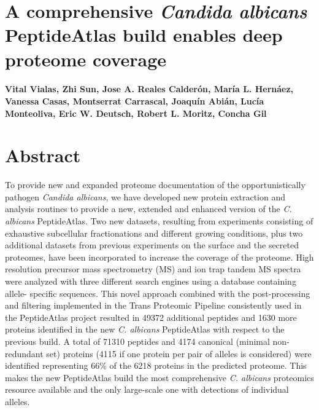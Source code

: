 %
%


\chapter*{A comprehensive \textit{Candida albicans} PeptideAtlas build enables deep proteome coverage}




\renewcommand{\headrulewidth}{0pt}

\subsubsection*{Vital Vialas, Zhi Sun, Jose A. Reales Calder\'on, Mar\'ia L. Hern\'aez, Vanessa Casas, Montserrat Carrascal, Joaqu\'in Abi\'an, Luc\'ia Monteoliva, Eric W. Deutsch, Robert L. Moritz, Concha Gil}

\newpage


\chapter*{Abstract}
To provide new and expanded proteome documentation of the opportunistically pathogen
\textit{Candida albicans}, we have developed new protein extraction and analysis routines to
provide a new, extended and enhanced version of the \textit{C. albicans} PeptideAtlas. Two new
datasets, resulting from experiments consisting of exhaustive subcellular fractionations and
different growing conditions, plus two additional datasets from previous experiments on the
surface and the secreted proteomes, have been incorporated to increase the coverage of the
proteome. High resolution precursor mass spectrometry (MS) and ion trap tandem MS
spectra were analyzed with three different search engines using a database containing allele-
specific sequences. This novel approach combined with the post-processing and filtering
implemented in the Trans Proteomic Pipeline consistently used in the PeptideAtlas project
resulted in 49372 additional peptides and 1630 more proteins identified in the new
\textit{C. albicans} PeptideAtlas with respect to the previous build. A total of 71310 peptides and
4174 canonical (minimal non-redundant set) proteins (4115 if one protein per pair of alleles is
considered) were identified representing 66\% of the 6218 proteins in the predicted proteome.
This makes the new PeptideAtlas build the most comprehensive \textit{C. albicans} proteomics
resource available and the only large-scale one with detections of individual alleles.

